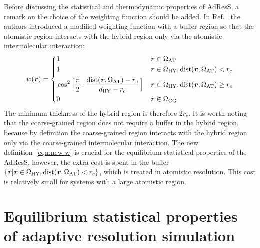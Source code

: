 \documentclass[epjST]{svjour}
\newcommand{\recheck}[1]{{\color{red} #1}}
\newcommand{\vect}[1]{\textbf{\textit{#1}}}
\newcommand{\dist}[0]{\textrm {dist}}
\newcommand{\AT}[0]{\textrm{AT}}
\newcommand{\HY}[0]{\textrm{HY}}
\newcommand{\CG}[0]{\textrm{CG}}
\begin{document}
Before discussing the statistical and thermodynamic properties of AdResS, a remark on the
choice of the weighting function should be added. 
In Ref.~\cite{wang2012adaptive} the authors introduced a modified weighting function with
a buffer region so that the atomistic region
interacts with the hybrid region only via the atomistic intermolecular interaction:
\begin{equation}\label{eqn:new-w}
  w(\vect r) =
  \left\{
    \begin{alignedat}{3}
      &1 &\quad& \vect r \in \Omega_\AT\\
      &1 && \vect r \in\Omega_\HY, \dist(\vect r, \Omega_\AT) < r_c \\
      &\cos^2\Big[\frac{\pi}{2 } \cdot \frac{\dist(\vect r, \Omega_\AT) - r_c}{d_{{\HY}} - r_c}\,\Big] && \vect r \in\Omega_\HY, \dist(\vect r, \Omega_\AT) \geq r_c\\
      &0 &    & \vect r \in \Omega_\CG 
    \end{alignedat}
  \right.
\end{equation}
The minimum thickness of the hybrid region is therefore $2r_c$.
It is worth noting that the coarse-grained region does not require a buffer in the hybrid region, because
by definition the coarse-grained region interacts with the hybrid region only via the coarse-grained intermolecular interaction.
The new definition~\eqref{eqn:new-w} is crucial for the equilibrium statistical properties of the AdResS,
however, the extra cost is spent in the buffer $\{\vect r \vert \vect r \in\Omega_\HY, \dist(\vect r, \Omega_\AT) < r_c\}$,
which is treated in atomistic resolution. This cost is relatively small for systems with a large atomistic region.


\section{Equilibrium statistical properties of adaptive resolution simulation}
\label{sec:statistical}
\end{document}
